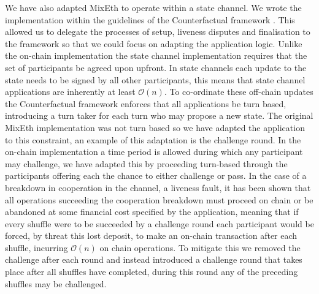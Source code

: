 \documentclass[a4paper]{article}
\theoremstyle{definition}
\begin{document}
We have also adapted MixEth to operate within a state channel. We wrote the implementation within the guidelines of the Counterfactual framework \cite{coleman2018counterfactual}. This allowed us to delegate the processes of setup, liveness disputes and finalisation to the framework so that we could focus on adapting the application logic. Unlike the on-chain implementation the state channel implementation requires that the set of participants be agreed upon upfront. In state channels each update to the state needs to be signed by all other participants, this means that state channel applications are inherently at least $\mathcal{O}(n)$. To co-ordinate these off-chain updates the Counterfactual framework enforces that all applications be turn based, introducing a turn taker for each turn who may propose a new state. The original MixEth implementation was not turn based so we have adapted the application to this constraint, an example of this adaptation is the challenge round. In the on-chain implementation a time period is allowed during which any participant may challenge, we have adapted this by proceeding turn-based through the participants offering each the chance to either challenge or pass. In the case of a breakdown in cooperation in the channel, a liveness fault, it has been shown that all operations succeeding the cooperation breakdown must proceed on chain\cite{mccorryyou} or be abandoned at some financial cost specified by the application, meaning that if every shuffle were to be succeeded by a challenge round each participant would be forced, by threat this lost deposit, to make an on-chain transaction after each shuffle, incurring $\mathcal{O}(n)$ on chain operations. To mitigate this we removed the challenge after each round and instead introduced a challenge round that takes place after all shuffles have completed, during this round any of the preceding shuffles may be challenged.
\end{document}
